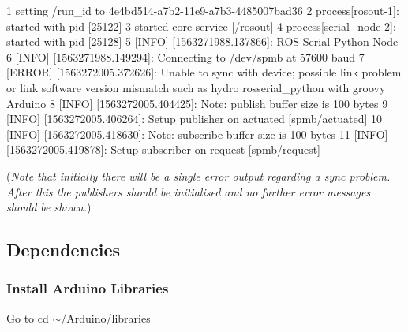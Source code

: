 \begin{DoxyCode}
1 setting /run\_id to 4e4bd514-a7b2-11e9-a7b3-4485007bad36
2 process[rosout-1]: started with pid [25122]
3 started core service [/rosout]
4 process[serial\_node-2]: started with pid [25128]
5 [INFO] [1563271988.137866]: ROS Serial Python Node
6 [INFO] [1563271988.149294]: Connecting to /dev/spmb at 57600 baud
7 [ERROR] [1563272005.372626]: Unable to sync with device; possible link problem or link software version
       mismatch such as hydro rosserial\_python with groovy Arduino
8 [INFO] [1563272005.404425]: Note: publish buffer size is 100 bytes
9 [INFO] [1563272005.406264]: Setup publisher on actuated [spmb/actuated]
10 [INFO] [1563272005.418630]: Note: subscribe buffer size is 100 bytes
11 [INFO] [1563272005.419878]: Setup subscriber on request [spmb/request]
\end{DoxyCode}


({\itshape Note that initially there will be a single error output regarding a sync problem. After this the publishers should be initialised and no further error messages should be shown.})





\subsection*{Dependencies}

\subsubsection*{Install Arduino Libraries}

Go to {\ttfamily cd $\sim$/\+Arduino/libraries}


